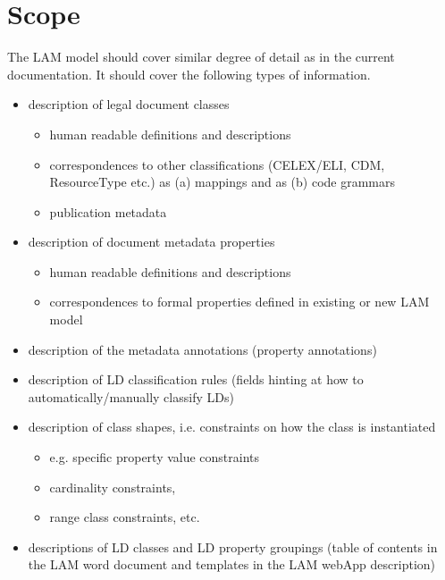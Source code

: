 \section{Scope}
\label{ariaid-title14}

The LAM model should cover similar degree of detail as in the current
documentation. It should cover the following types of information.

\begin{itemize}
\item
  description of legal document classes

  \begin{itemize}
  \item
    human readable definitions and descriptions
  \item
    correspondences to other classifications (CELEX/ELI, CDM,
    ResourceType etc.) as (a) mappings and as (b) code grammars
  \item
    publication metadata
  \end{itemize}
\item
  description of document metadata properties
    \begin{itemize}
  	\item
  	human readable definitions and descriptions
  	\item
  	correspondences to formal properties defined in existing or new LAM model
  \end{itemize}
\item
  description of the metadata annotations (property annotations)
\item
  description of LD classification rules (fields hinting at how to automatically/manually classify LDs)
\item
  description of class shapes, i.e. constraints on how the class is
  instantiated

  \begin{itemize}
  \item e.g. specific property value constraints 
  \item cardinality constraints, 
  \item range class constraints, etc.
  \end{itemize}
\item
  descriptions of LD classes and LD property groupings (table of
  contents in the LAM word document and templates in the LAM webApp
  description)
\end{itemize}

